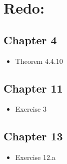 \documentclass[a4paper, oneside]{book}
\begin{document}
\clearpage
\section{Redo:}
\subsection*{Chapter 4}
\begin{itemize}
\item Theorem 4.4.10
\end{itemize}
\subsection*{Chapter 11}
\begin{itemize}
\item Exercise 3
\end{itemize}
\subsection*{Chapter 13}
\begin{itemize}
\item Exercise 12.a
\end{itemize}









\end{document}
